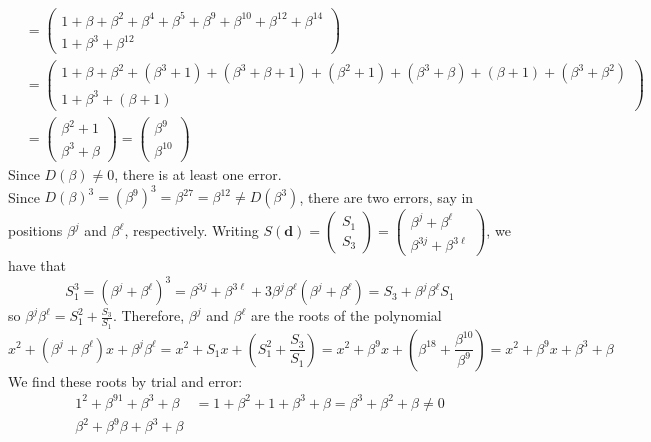 \documentclass[11pt]{article}
\renewcommand{\vec}[1]{\mathbf{#1}}
\newcommand{\vc}[1]{\begin{pmatrix}#1\end{pmatrix}}
\begin{document}
\begin{itemize}
\begin{align*}
                               &= \vc{1 + \beta   + \beta^2 + \beta^4    + \beta^5    + \beta^9    + \beta^{10} + \beta^{12} + \beta^{14} \\
                                      1 + \beta^3 + \beta^{12}}\\
                               &= \vc{1 + \beta   + \beta^2 + (\beta^3+1)+ (\beta^3+\beta+1) + (\beta^2+1) + (\beta^3 + \beta) + (\beta + 1) + (\beta^3 + \beta^2)\\
                                      1 + \beta^3 + (\beta+1)}\\
                               &= \vc{\beta^2+1\\
                                      \beta^3+\beta}
                                = \vc{\beta^9\\
                                      \beta^{10}}
                   \end{align*}
                   Since $D(\beta)\neq 0$, there is at least one error.\\
                   Since $D(\beta)^3 = (\beta^9)^3 = \beta^{27} = \beta^{12} \neq D(\beta^3)$,
                   there are two errors, say in positions $\beta^j$ and $\beta^\ell$, respectively.
                   Writing $S(\vec{d}) = \vc{S_1\\S_3} = \vc{\beta^j + \beta^\ell\\\beta^{3j} + \beta^{3\ell}}$,
                   we have that
                   \[
                     S_1^3 = (\beta^j + \beta^\ell)^3
                           = \beta^{3j} + \beta^{3\ell} + 3\beta^j\beta^\ell(\beta^j + \beta^\ell)
                           = S_3 + \beta^j\beta^\ell S_1
                   \]
                   so $\beta^j\beta^\ell = S_1^2 + \frac{S_3}{S_1}$.
                   Therefore,
                   $\beta^j$ and $\beta^\ell$ are the roots of the polynomial
                   \[
                     x^2 + (\beta^j+\beta^\ell)x + \beta^j\beta^\ell
                   = x^2 + S_1x + (S_1^2 + \frac{S_3}{S_1})
                   = x^2 + \beta^9x + (\beta^{18}+\frac{\beta^{10}}{\beta^9})
                   = x^2 + \beta^9x + \beta^3 + \beta
                   \]
                   We find these roots by trial and error:
                   \begin{align*}
                        1^2 + \beta^91 + \beta^3 + \beta
                     &= 1 + \beta^2 + 1 + \beta^3 + \beta
                      = \beta^3 + \beta^2 + \beta
                      \neq 0\\
                        \beta^2 + \beta^9\beta + \beta^3 + \beta

\end{align*}
\end{itemize}
\end{document}

